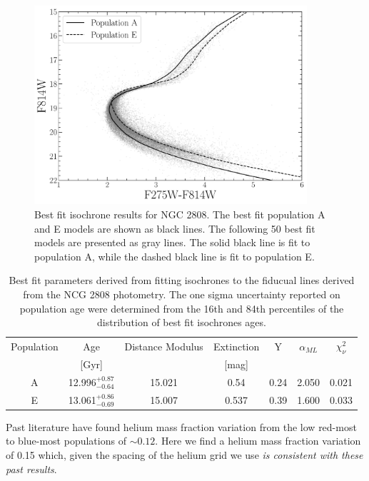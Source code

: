 \begin{figure}
  \centering
  \includegraphics[width=0.9\textwidth]{figures/ngc2808/BestFitResults.pdf}
  \caption{Best fit isochrone results for NGC 2808. The best fit population A
  and E models are shown as black lines. The following 50 best fit models are
  presented as gray lines. The solid black line is fit to population A, while
  the dashed black line is fit to population E.}
  \label{fig:BestFitResults}
\end{figure}

\begin{table}
  \centering
  \begin{tabular}{c | c c c c c c}
    \hline
    Population & Age & Distance Modulus & Extinction & Y & $\alpha_{ML}$ & $\chi^{2}_{\nu}$\\
    & [Gyr] & & [mag] & & &\\
    \hline
    \hline
    A & 12.996$^{+0.87}_{-0.64}$ & 15.021 & 0.54 & 0.24 & 2.050 & 0.021\\
    E & 13.061$^{+0.86}_{-0.69}$ & 15.007 & 0.537 & 0.39 & 1.600 & 0.033 \\
    \hline
  \end{tabular}
  \caption{Best fit parameters derived from fitting isochrones to the fiducual
  lines derived from the NCG 2808 photometry. The one sigma uncertainty
  reported on population age were determined from the 16th and 84th percentiles
  of the distribution of best fit isochrones ages.}
  \label{tab:BestFitResults}
\end{table}


Past literature \citep[e.g. ][]{Milone2015, Milone2018} have found helium mass
fraction variation from the low red-most to blue-most populations of $\sim 0.12$.
Here we find a helium mass fraction variation of 0.15 which, given the spacing
of the helium grid we use {\em is consistent with these past results}.

